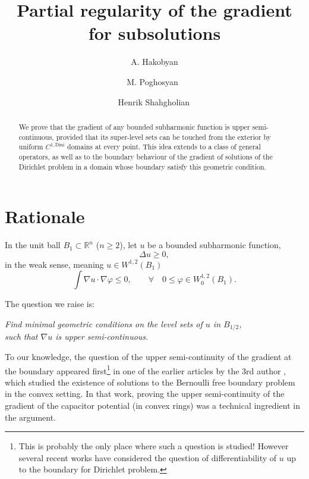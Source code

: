\documentclass[11pt,reqno]{amsart}
\title[Partial regularity of the  gradient for subsolutions]{Partial regularity of the  gradient for subsolutions}
\author{A. Hakobyan}\address[Aram Hakobyan]{Yerevan, Armenia.}
\author{M. Poghosyan \, \orcidlink{0009-0002-0066-5494}}
\author[Shahgholian]{Henrik Shahgholian\,\orcidlink{0000-0002-1316-7913}}
\newcommand{\R}{{\mathbb R}}
\theoremstyle{plain}
\theoremstyle{remark}
\numberwithin{equation}{section}
\begin{document}
\begin{abstract}
We prove that the gradient of any bounded subharmonic function is upper semi-continuous, provided that its super-level sets can be touched from the exterior by  uniform $C^{1,\text{Dini}}$ domains at every point.
This idea extends to a class of  general operators, as well as  to  the boundary behaviour of the gradient of  solutions of the Dirichlet problem  in a domain whose boundary satisfy this geometric condition. 





\end{abstract}

\maketitle




\section{Rationale}

In the unit ball $B_1 \subset \R^n$ ($n\geq 2$), let $u$ be a bounded subharmonic  function,  
\begin{equation}\label{eq:sub}
\Delta u \geq 0 ,
\end{equation}
in the weak sense, meaning $u \in W^{1,2} (B_1)$
$$
\int \nabla u \cdot \nabla \varphi \leq 0, 
\qquad \forall  \quad
0 \leq \varphi \in W_0^{1,2}(B_1).
$$


The question we raise is: 

    \begin{center}
    {\it Find minimal geometric conditions on the level sets of  $u$ in $B_{1/2}$, \\ such that $\nabla u$ is upper semi-continuous.  }
\end{center}






To  our  knowledge,  the question of the upper semi-continuity of the gradient at the boundary appeared first\footnote{This is probably  the only place where such a question is studied! However several recent works have considered the question of differentiability of $u$ up to the boundary for Dirichlet problem.}  in one of the  earlier articles by the 3rd author \cite{Henrot-Sh-2000}, which studied the existence of solutions to the Bernoulli free boundary problem in the convex setting. In that work, proving the  upper semi-continuity of the gradient of the capacitor potential (in convex rings) was a technical ingredient in the argument.
\end{document}
